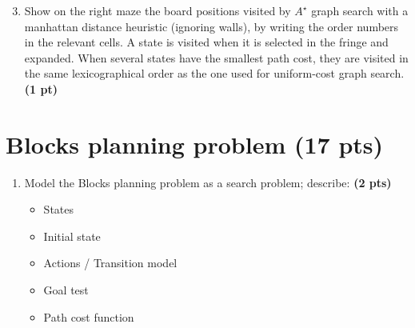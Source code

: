 \documentclass[11pt,a4paper]{report}
\begin{document}
\begin{enumerate}
\setcounter{enumi}{2}
\item Show on the right maze the board positions visited by $A^{\star}$ graph search with a manhattan distance heuristic (ignoring walls), by writing the order numbers in the relevant cells. A state is visited when it is selected in the fringe and expanded. When several states have the smallest path cost, they are visited in the same lexicographical order as the one used for uniform-cost graph search. \textbf{(1 pt)}
\end{enumerate}

\begin{answers}[5.2cm]
\begin{center}
\end{center}
\end{answers}




\section{Blocks planning problem (17 pts)}

\begin{enumerate}
  \item Model the Blocks planning problem as a search problem; describe: \textbf{(2 pts)}
		\begin{itemize}
			\item States
			\item Initial state
			\item Actions / Transition model
			\item Goal test
			\item Path cost function
		\end{itemize}
\end{enumerate}

\begin{answers}[6cm]
\end{answers}
\end{document}
